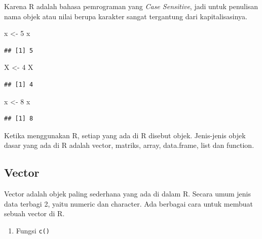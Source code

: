 \documentclass[]{book}
\newenvironment{Shaded}{\begin{snugshade}}{\end{snugshade}}
\newcommand{\DecValTok}[1]{\textcolor[rgb]{0.00,0.00,0.81}{#1}}
\newcommand{\NormalTok}[1]{#1}
\newcommand{\StringTok}[1]{\textcolor[rgb]{0.31,0.60,0.02}{#1}}
\providecommand{\tightlist}{%
  \setlength{\itemsep}{0pt}\setlength{\parskip}{0pt}}
\begin{document}
Karena R adalah bahasa pemrograman yang \emph{Case Sensitive}, jadi untuk penulisan nama objek atau nilai berupa karakter sangat tergantung dari kapitalisasinya.

\begin{Shaded}
\begin{Highlighting}[]
\NormalTok{x <-}\StringTok{ }\DecValTok{5}
\NormalTok{x}
\end{Highlighting}
\end{Shaded}

\begin{verbatim}
## [1] 5
\end{verbatim}

\begin{Shaded}
\begin{Highlighting}[]
\NormalTok{X <-}\StringTok{ }\DecValTok{4}
\NormalTok{X}
\end{Highlighting}
\end{Shaded}

\begin{verbatim}
## [1] 4
\end{verbatim}

\begin{Shaded}
\begin{Highlighting}[]
\NormalTok{x <-}\StringTok{ }\DecValTok{8}
\NormalTok{x}
\end{Highlighting}
\end{Shaded}

\begin{verbatim}
## [1] 8
\end{verbatim}

Ketika menggunakan R, setiap yang ada di R disebut objek. Jenis-jenis objek dasar yang ada di R adalah vector, matriks, array, data.frame, list dan function.

\hypertarget{vector}{%
\subsection{Vector}\label{vector}}

Vector adalah objek paling sederhana yang ada di dalam R. Secara umum jenis data terbagi 2, yaitu numeric dan character. Ada berbagai cara untuk membuat sebuah vector di R.

\begin{enumerate}
\def\labelenumi{\arabic{enumi}.}
\tightlist
\item
  Fungsi \texttt{c()}
\end{enumerate}
\end{document}
